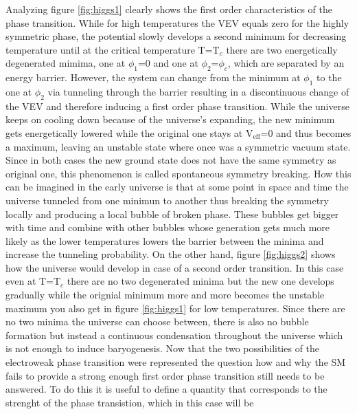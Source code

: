 Analyzing figure \ref{fig:higgs1} clearly shows the first order characteristics of the phase transition. While for high temperatures the VEV equals zero for the highly symmetric phase, the potential slowly develops a second minimum for decreasing temperature until at the critical temperature T=T$_c$ there are two energetically degenerated mimima, one at $\phi_1$=0 and one at $\phi_2$=$\phi_c$, which are separated by an energy barrier. However, the system can change from the minimum at $\phi_1$ to the one at $\phi_2$ via tunneling through the barrier resulting in a discontinuous change of the VEV and therefore inducing a first order phase transition. While the universe keeps on cooling down because of the universe's expanding, the new minimum gets energetically lowered while the original one stays at V$_\text{eff}$=0 and thus becomes a maximum, leaving an unstable state where once was a symmetric vacuum state. Since in both cases the new ground state does not have the same symmetry as original one, this phenomenon is called spontaneous symmetry breaking.\newline\indent
How this can be imagined in the early universe is that at some point in space and time the universe tunneled from one minimun to another thus breaking the symmetry locally and producing a local bubble of broken phase. These bubbles get bigger with time and combine with other bubbles whose generation gets much more likely as the lower temperatures lowers the barrier between the minima and increase the tunneling probability. \newline\indent
On the other hand, figure \ref{fig:higgs2} shows how the universe would develop in case of a second order transition. In this case even at T=T$_c$ there are no two degenerated minima but the new one develops gradually while the orignial minimum more and more becomes the unstable maximum you also get in figure \ref{fig:higgs1} for low temperatures. Since there are no two minima the universe can choose between, there is also no bubble formation but instead a continuous condensation throughout the universe which is not enough to induce baryogenesis. \newline\indent
Now that the two possibilities of the electroweak phase transition were represented the question how and why the SM fails to provide a strong enough first order phase transition still needs to be answered. \newline\indent
To do this it is useful to define a quantity that corresponds to the strenght of the phase transistion, which in this case will be 
